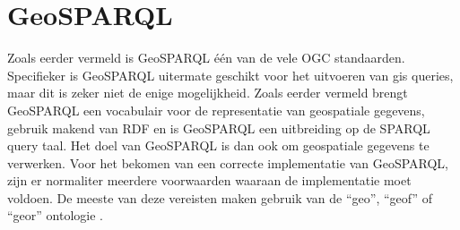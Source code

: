 \section{GeoSPARQL}
\label{sec:geosparql}

Zoals eerder vermeld is GeoSPARQL één van de vele OGC standaarden. Specifieker is GeoSPARQL uitermate geschikt voor het uitvoeren van \acrfull{gis} queries, maar dit is zeker niet de enige mogelijkheid. Zoals eerder vermeld brengt GeoSPARQL een vocabulair voor de representatie van geospatiale gegevens, gebruik makend van RDF en is GeoSPARQL een uitbreiding op de SPARQL query taal. Het doel van GeoSPARQL is dan ook om geospatiale gegevens te verwerken. Voor het bekomen van een correcte implementatie van GeoSPARQL, zijn er normaliter meerdere voorwaarden waaraan de implementatie moet voldoen. De meeste van deze vereisten maken gebruik van de ``geo'', ``geof'' of ``geor'' ontologie \cite{ogcdocs}.


